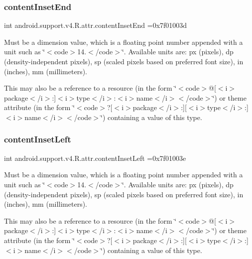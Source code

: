 \subsubsection{\texorpdfstring{content\+Inset\+End}{contentInsetEnd}}
{\footnotesize\ttfamily int android.\+support.\+v4.\+R.\+attr.\+content\+Inset\+End =0x7f01003d\hspace{0.3cm}{\ttfamily [static]}}

Must be a dimension value, which is a floating point number appended with a unit such as \char`\"{}$<$code$>$14.\+5sp$<$/code$>$\char`\"{}. Available units are\+: px (pixels), dp (density-\/independent pixels), sp (scaled pixels based on preferred font size), in (inches), mm (millimeters). 

This may also be a reference to a resource (in the form \char`\"{}$<$code$>$@\mbox{[}$<$i$>$package$<$/i$>$\+:\mbox{]}$<$i$>$type$<$/i$>$\+:$<$i$>$name$<$/i$>$$<$/code$>$\char`\"{}) or theme attribute (in the form \char`\"{}$<$code$>$?\mbox{[}$<$i$>$package$<$/i$>$\+:\mbox{]}\mbox{[}$<$i$>$type$<$/i$>$\+:\mbox{]}$<$i$>$name$<$/i$>$$<$/code$>$\char`\"{}) containing a value of this type. \mbox{\label{classandroid_1_1support_1_1v4_1_1R_1_1attr_ae2b4db4a6417ce171035f616b2fa4d20}} 
\subsubsection{\texorpdfstring{content\+Inset\+Left}{contentInsetLeft}}
{\footnotesize\ttfamily int android.\+support.\+v4.\+R.\+attr.\+content\+Inset\+Left =0x7f01003e\hspace{0.3cm}{\ttfamily [static]}}

Must be a dimension value, which is a floating point number appended with a unit such as \char`\"{}$<$code$>$14.\+5sp$<$/code$>$\char`\"{}. Available units are\+: px (pixels), dp (density-\/independent pixels), sp (scaled pixels based on preferred font size), in (inches), mm (millimeters). 

This may also be a reference to a resource (in the form \char`\"{}$<$code$>$@\mbox{[}$<$i$>$package$<$/i$>$\+:\mbox{]}$<$i$>$type$<$/i$>$\+:$<$i$>$name$<$/i$>$$<$/code$>$\char`\"{}) or theme attribute (in the form \char`\"{}$<$code$>$?\mbox{[}$<$i$>$package$<$/i$>$\+:\mbox{]}\mbox{[}$<$i$>$type$<$/i$>$\+:\mbox{]}$<$i$>$name$<$/i$>$$<$/code$>$\char`\"{}) containing a value of this type. \mbox{\label{classandroid_1_1support_1_1v4_1_1R_1_1attr_aae1b287277312b537031bed0d24863b0}} 
